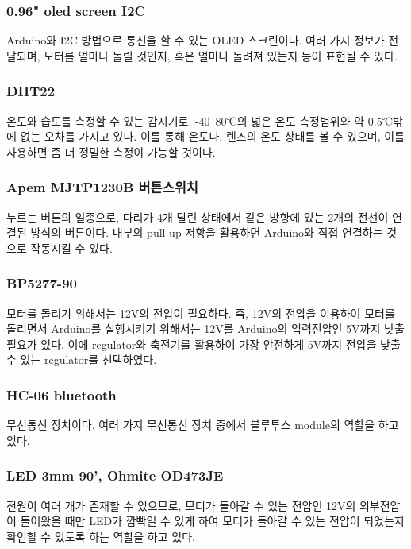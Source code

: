 \subsubsection{0.96" oled screen I2C}

Arduino와 I2C 방법으로 통신을 할 수 있는 OLED 스크린이다. 여러 가지 정보가 전달되며, 모터를 얼마나 돌릴 것인지, 혹은 얼마나 돌려져 있는지 등이 표현될 수 있다.

\subsubsection{DHT22}

온도와 습도를 측정할 수 있는 감지기로, -40~80℃의 넓은 온도 측정범위와 약 0.5℃밖에 없는 오차를 가지고 있다. 이를 통해 온도나, 렌즈의 온도 상태를 볼 수 있으며, 이를 사용하면 좀 더 정밀한 측정이 가능할 것이다.

\subsubsection{Apem MJTP1230B 버튼스위치}

누르는 버튼의 일종으로, 다리가 4개 달린 상태에서 같은 방향에 있는 2개의 전선이 연결된 방식의 버튼이다. 내부의 pull-up 저항을 활용하면 Arduino와 직접 연결하는 것으로 작동시킬 수 있다.

\subsubsection{BP5277-90}

모터를 돌리기 위해서는 12V의 전압이 필요하다. 즉, 12V의 전압을 이용하여 모터를 돌리면서 Arduino를 실행시키기 위해서는 12V를 Arduino의 입력전압인 5V까지 낮출 필요가 있다. 이에 regulator와 축전기를 활용하여 가장 안전하게 5V까지 전압을 낮출 수 있는 regulator를 선택하였다.

\subsubsection{HC-06 bluetooth}

무선통신 장치이다. 여러 가지 무선통신 장치 중에서 블루투스 module의 역할을 하고 있다.

\subsubsection{LED 3mm 90', Ohmite OD473JE}

전원이 여러 개가 존재할 수 있으므로, 모터가 돌아갈 수 있는 전압인 12V의 외부전압이 들어왔을 때만 LED가 깜빡일 수 있게 하여 모터가 돌아갈 수 있는 전압이 되었는지 확인할 수 있도록 하는 역할을 하고 있다.

